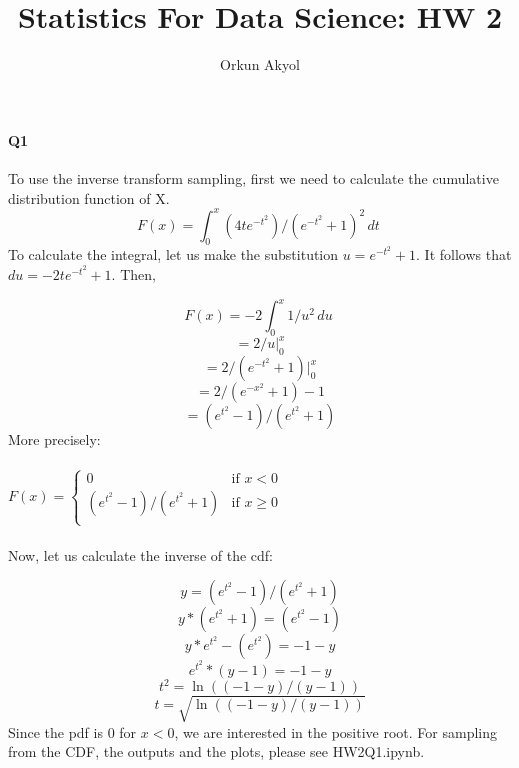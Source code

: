 \documentclass[10pt,letterpaper]{article}
\author{Orkun Akyol}
\title{Statistics For Data Science: HW 2}
\begin{document}
\paragraph{Q1}
    To use the inverse transform sampling, first we need to calculate the cumulative distribution function of X. 
    \[
        F(x) = \int_{0}^{x} (4te^{-t^2})/(e^{-t^2}+1)^2 \,dt \
    \]    
    To calculate the integral, let us make the substitution \(u = e^{-t^2}+1 \). It follows that \(du = -2te^{-t^2}+1 \). Then,

    \[
        F(x) = -2\int_{0}^{x} 1/u^2 \,du \
    \]   
    \[
        = 2/u \bigg\rvert_0^x
    \] 
    \[
        = 2/(e^{-t^2}+1) \bigg\rvert_0^x
    \]  
    \[
        = 2/(e^{-x^2}+1)-1
    \]          
    \[
        = (e^{t^2}-1)/(e^{t^2}+1)
    \]         
        More precisely: \\
        \text{} \\
    $F(x) = \begin{cases}
        0 & \text{if } x < 0\\
        (e^{t^2}-1)/(e^{t^2}+1) & \text{if } x \ge 0\\
    \end{cases}$ \\
        \text{} \\

    Now, let us calculate the inverse of the cdf: 
    
     \[
        y = (e^{t^2}-1)/(e^{t^2}+1)
    \]    
    \[
        y * (e^{t^2}+1) = (e^{t^2}-1) 
    \]  
    \[
        y * e^{t^2} - (e^{t^2}) = -1-y 
    \]
    \[
        e^{t^2} * (y-1) = -1-y
    \]
    \[
        t^2 = \ln((-1-y)/(y-1))
    \]
        \[
        t = \sqrt{\ln((-1-y)/(y-1))}
    \]
    Since the pdf is $0$ for $x<0$, we are interested in the positive root. For sampling from the CDF, the outputs and the plots, please see HW2Q1.ipynb. 
\end{document}

